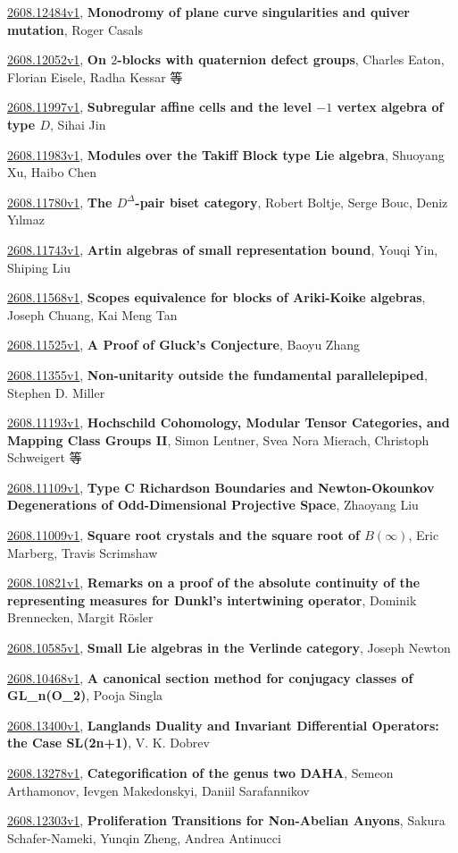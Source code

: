 \documentclass[9pt, a4paper]{article}
\theoremstyle{plain}
\theoremstyle{definition}
\theoremstyle{remark}
\newcommand{\arxiv}[3]{\href{https://arxiv.org/abs/#1}{#1}, \textbf{\textcolor{arxivblue}{#2}}, #3}
\begin{document}
\arxiv{2608.12484v1}{Monodromy of plane curve singularities and quiver mutation}{Roger Casals}

\arxiv{2608.12052v1}{On $2$-blocks with quaternion defect groups}{Charles Eaton, Florian Eisele, Radha Kessar 等}

\arxiv{2608.11997v1}{Subregular affine cells and the level $-1$ vertex algebra of type $D$}{Sihai Jin}

\arxiv{2608.11983v1}{Modules over the Takiff Block type Lie algebra}{Shuoyang Xu, Haibo Chen}

\arxiv{2608.11780v1}{The $D^Δ$-pair biset category}{Robert Boltje, Serge Bouc, Deniz Yılmaz}

\arxiv{2608.11743v1}{Artin algebras of small representation bound}{Youqi Yin, Shiping Liu}

\arxiv{2608.11568v1}{Scopes equivalence for blocks of Ariki-Koike algebras}{Joseph Chuang, Kai Meng Tan}

\arxiv{2608.11525v1}{A Proof of Gluck's Conjecture}{Baoyu Zhang}

\arxiv{2608.11355v1}{Non-unitarity outside the fundamental parallelepiped}{Stephen D. Miller}

\arxiv{2608.11193v1}{Hochschild Cohomology, Modular Tensor Categories, and Mapping Class Groups II}{Simon Lentner, Svea Nora Mierach, Christoph Schweigert 等}

\arxiv{2608.11109v1}{Type C Richardson Boundaries and Newton-Okounkov Degenerations of Odd-Dimensional Projective Space}{Zhaoyang Liu}

\arxiv{2608.11009v1}{Square root crystals and the square root of $B(\infty)$}{Eric Marberg, Travis Scrimshaw}

\arxiv{2608.10821v1}{Remarks on a proof of the absolute continuity of the representing measures for Dunkl's intertwining operator}{Dominik Brennecken, Margit Rösler}

\arxiv{2608.10585v1}{Small Lie algebras in the Verlinde category}{Joseph Newton}

\arxiv{2608.10468v1}{A canonical section method for conjugacy classes of GL_n(O_2)}{Pooja Singla}

\arxiv{2608.13400v1}{Langlands Duality and Invariant Differential Operators: the Case SL(2n+1)}{V. K. Dobrev}

\arxiv{2608.13278v1}{Categorification of the genus two DAHA}{Semeon Arthamonov, Ievgen Makedonskyi, Daniil Sarafannikov}

\arxiv{2608.12303v1}{Proliferation Transitions for Non-Abelian Anyons}{Sakura Schafer-Nameki, Yunqin Zheng, Andrea Antinucci}
\end{document}
